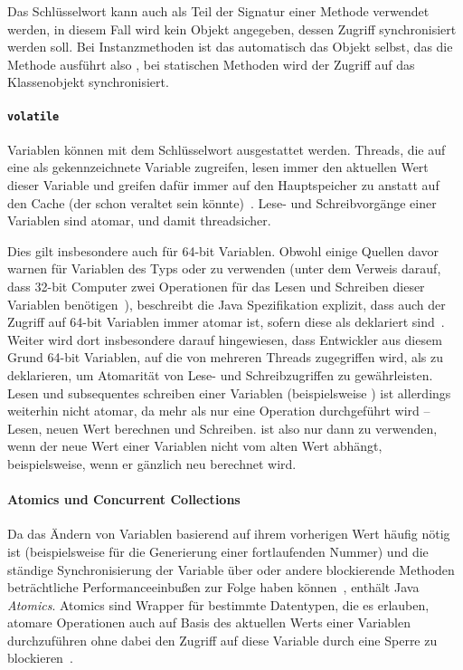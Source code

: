 Das Schlüsselwort  kann auch als Teil der Signatur einer Methode verwendet werden, in diesem Fall wird kein Objekt angegeben, dessen Zugriff synchronisiert werden soll. Bei Instanzmethoden ist das automatisch das Objekt selbst, das die Methode ausführt also , bei statischen Methoden wird der Zugriff auf das Klassenobjekt synchronisiert.

\paragraph{\texttt{volatile}} Variablen können mit dem Schlüsselwort  ausgestattet werden. Threads, die auf eine als  gekennzeichnete Variable zugreifen, lesen immer den aktuellen Wert dieser Variable und greifen dafür immer auf den Hauptspeicher zu anstatt auf den Cache (der schon veraltet sein könnte)~\cite[S.~30~ff.]{Friesen2015}. Lese- und Schreibvorgänge einer  Variablen sind atomar, und damit threadsicher.

Dies gilt insbesondere auch für 64-bit Variablen. Obwohl einige Quellen davor warnen  für Variablen des Typs  oder  zu verwenden (unter dem Verweis darauf, dass 32-bit Computer zwei Operationen für das Lesen und Schreiben dieser Variablen benötigen~\cite[S.~34]{Friesen2015}), beschreibt die Java Spezifikation explizit, dass auch der Zugriff auf 64-bit Variablen immer atomar ist, sofern diese als  deklariert sind~\cite{Java7Spec17}. Weiter wird dort insbesondere darauf hingewiesen, dass Entwickler aus diesem Grund 64-bit Variablen, auf die von mehreren Threads zugegriffen wird, als  zu deklarieren, um Atomarität von Lese- und Schreibzugriffen zu gewährleisten. Lesen und subsequentes schreiben einer  Variablen (beispielsweise ) ist allerdings weiterhin nicht atomar, da mehr als nur eine Operation durchgeführt wird -- Lesen, neuen Wert berechnen und Schreiben.  ist also nur dann zu verwenden, wenn der neue Wert einer Variablen nicht vom alten Wert abhängt, beispielsweise, wenn er gänzlich neu berechnet wird. 

\paragraph{Atomics und Concurrent Collections} Da das Ändern von Variablen basierend auf ihrem vorherigen Wert häufig nötig ist (beispielsweise für die Generierung einer fortlaufenden Nummer) und die ständige Synchronisierung der Variable über  oder andere blockierende Methoden beträchtliche Performanceeinbußen zur Folge haben können~\cite[S.~130]{Friesen2015}, enthält Java \emph{Atomics}. Atomics sind Wrapper für bestimmte Datentypen, die es erlauben, atomare Operationen auch auf Basis des aktuellen Werts einer Variablen durchzuführen ohne dabei den Zugriff auf diese Variable durch eine Sperre zu blockieren~\cite[S.~130]{Friesen2015}. 

